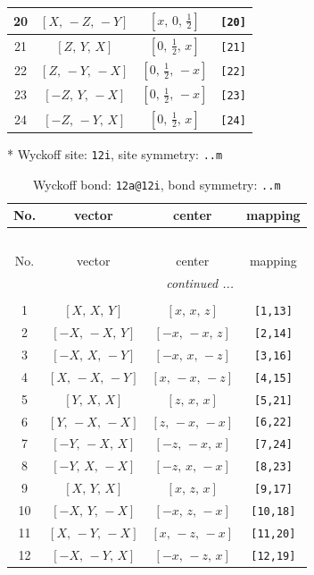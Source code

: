 \documentclass[fleqn,8pt]{jsarticle}
\begin{document}
\begin{longtable}{cccc}
20 & $\left[ X,\, - Z,\, - Y \right]$ & $\left[ x,\, 0,\, \frac{1}{2} \right]$ & {\tt [20]} \\ \hline
21 & $\left[ Z,\, Y,\, X \right]$ & $\left[ 0,\, \frac{1}{2},\, x \right]$ & {\tt [21]} \\ \hline
22 & $\left[ Z,\, - Y,\, - X \right]$ & $\left[ 0,\, \frac{1}{2},\, - x \right]$ & {\tt [22]} \\ \hline
23 & $\left[ - Z,\, Y,\, - X \right]$ & $\left[ 0,\, \frac{1}{2},\, - x \right]$ & {\tt [23]} \\ \hline
24 & $\left[ - Z,\, - Y,\, X \right]$ & $\left[ 0,\, \frac{1}{2},\, x \right]$ & {\tt [24]} \\
\end{longtable}
* Wyckoff site: {\tt 12i}, site symmetry: {\tt ..m}
\renewcommand{\arraystretch}{1.2}
\begin{longtable}{cccc}
\caption{Wyckoff bond: {\tt 12a@12i}, bond symmetry: {\tt ..m}}
 \\
 \hline \hline
No. & vector & center & mapping \\ \hline \endfirsthead

\multicolumn{3}{l}{\tablename\ \thetable{}} \\
 \hline \hline
No. & vector & center & mapping \\ \hline \endhead

 \hline \hline
\multicolumn{3}{r}{\footnotesize\it continued ...} \\ \endfoot

 \hline \hline
\multicolumn{3}{r}{} \\ \endlastfoot

1 & $\left[ X,\, X,\, Y \right]$ & $\left[ x,\, x,\, z \right]$ & {\tt [1,13]} \\ \hline
2 & $\left[ - X,\, - X,\, Y \right]$ & $\left[ - x,\, - x,\, z \right]$ & {\tt [2,14]} \\ \hline
3 & $\left[ - X,\, X,\, - Y \right]$ & $\left[ - x,\, x,\, - z \right]$ & {\tt [3,16]} \\ \hline
4 & $\left[ X,\, - X,\, - Y \right]$ & $\left[ x,\, - x,\, - z \right]$ & {\tt [4,15]} \\ \hline
5 & $\left[ Y,\, X,\, X \right]$ & $\left[ z,\, x,\, x \right]$ & {\tt [5,21]} \\ \hline
6 & $\left[ Y,\, - X,\, - X \right]$ & $\left[ z,\, - x,\, - x \right]$ & {\tt [6,22]} \\ \hline
7 & $\left[ - Y,\, - X,\, X \right]$ & $\left[ - z,\, - x,\, x \right]$ & {\tt [7,24]} \\ \hline
8 & $\left[ - Y,\, X,\, - X \right]$ & $\left[ - z,\, x,\, - x \right]$ & {\tt [8,23]} \\ \hline
9 & $\left[ X,\, Y,\, X \right]$ & $\left[ x,\, z,\, x \right]$ & {\tt [9,17]} \\ \hline
10 & $\left[ - X,\, Y,\, - X \right]$ & $\left[ - x,\, z,\, - x \right]$ & {\tt [10,18]} \\ \hline
11 & $\left[ X,\, - Y,\, - X \right]$ & $\left[ x,\, - z,\, - x \right]$ & {\tt [11,20]} \\ \hline
12 & $\left[ - X,\, - Y,\, X \right]$ & $\left[ - x,\, - z,\, x \right]$ & {\tt [12,19]} \\
\end{longtable}
\end{document}
